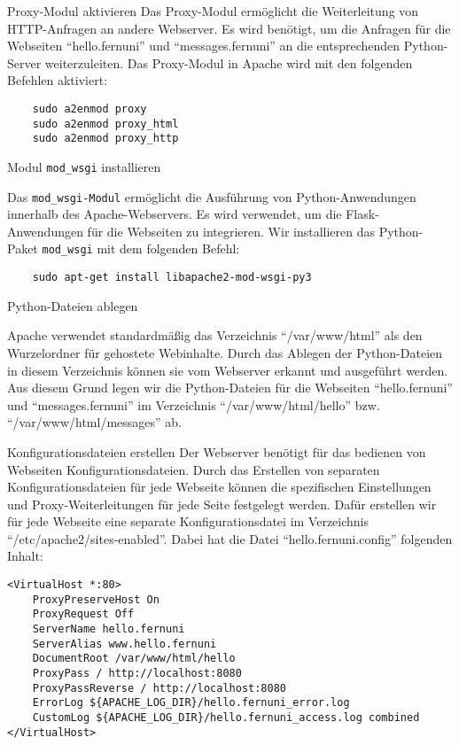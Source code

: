 Proxy-Modul aktivieren
Das Proxy-Modul ermöglicht die Weiterleitung von HTTP-Anfragen an andere Webserver. Es wird benötigt, um die Anfragen für die Webseiten \enquote{hello.fernuni} und \enquote{messages.fernuni} an die entsprechenden Python-Server weiterzuleiten.
Das Proxy-Modul in Apache wird mit den folgenden Befehlen aktiviert:

\begin{verbatim}
    sudo a2enmod proxy
    sudo a2enmod proxy_html
    sudo a2enmod proxy_http
\end{verbatim}

Modul \verb+mod_wsgi+ installieren

Das \verb+mod_wsgi-Modul+ ermöglicht die Ausführung von Python-Anwendungen innerhalb des Apache-Webservers. Es wird verwendet, um die Flask-Anwendungen für die Webseiten zu integrieren.
Wir installieren das Python-Paket \verb+mod_wsgi+ mit dem folgenden Befehl:

\begin{verbatim}
    sudo apt-get install libapache2-mod-wsgi-py3
\end{verbatim}

Python-Dateien ablegen

Apache verwendet standardmäßig das Verzeichnis \enquote{/var/www/html} als den Wurzelordner für gehostete Webinhalte. Durch das Ablegen der Python-Dateien in diesem Verzeichnis können sie vom Webserver erkannt und ausgeführt werden.
Aus diesem Grund legen wir die Python-Dateien für die Webseiten \enquote{hello.fernuni} und \enquote{messages.fernuni} im Verzeichnis \enquote{/var/www/html/hello}  bzw. \enquote{/var/www/html/messages} ab. 

Konfigurationsdateien erstellen
Der Webserver benötigt für das bedienen von Webseiten Konfigurationsdateien.
Durch das Erstellen von separaten Konfigurationsdateien für jede Webseite können die spezifischen Einstellungen und Proxy-Weiterleitungen für jede Seite festgelegt werden.
Dafür erstellen wir für jede Webseite eine separate Konfigurationsdatei im Verzeichnis \enquote{/etc/apache2/sites-enabled}. 
Dabei hat die Datei \enquote{hello.fernuni.config} folgenden Inhalt:
\begin{verbatim}
<VirtualHost *:80> 
    ProxyPreserveHost On
    ProxyRequest Off
    ServerName hello.fernuni 
    ServerAlias www.hello.fernuni 
    DocumentRoot /var/www/html/hello
    ProxyPass / http://localhost:8080
    ProxyPassReverse / http://localhost:8080
    ErrorLog ${APACHE_LOG_DIR}/hello.fernuni_error.log
    CustomLog ${APACHE_LOG_DIR}/hello.fernuni_access.log combined
</VirtualHost>
\end{verbatim}

